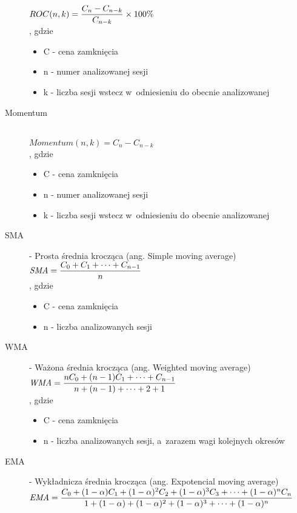 \begin{description}
		$\displaystyle ROC(n, k) = { C_n - C_{n-k} \over C_{n-k} } \times 100\%$ \\
		, gdzie \hfill
			\begin{itemize}
				\item C - cena zamknięcia
				\item n - numer analizowanej sesji
				\item k - liczba sesji wstecz w~odniesieniu do obecnie analizowanej
			\end{itemize}
	\item[Momentum] \hfill \\
		$\displaystyle Momentum(n, k) = C_n - C_{n-k}$ \\
		, gdzie \hfill
			\begin{itemize}
				\item C - cena zamknięcia
				\item n - numer analizowanej sesji
				\item k - liczba sesji wstecz w~odniesieniu do obecnie analizowanej
			\end{itemize}
	\item[SMA] - Prosta średnia krocząca (ang. Simple moving average) \hfill \\
		$\displaystyle \textit{SMA} = { C_{0} + C_{1} + \cdots + C_{n-1} \over n }$ \\
		, gdzie \hfill
			\begin{itemize}
				\item C - cena zamknięcia
				\item n - liczba analizowanych sesji
			\end{itemize}
	\item[WMA] - Ważona średnia krocząca (ang. Weighted moving average) \hfill \\
		$\displaystyle \textit{WMA} = { n C_{0} + (n-1) C_{1} + \cdots + C_{n-1} \over n + (n-1) + \cdots + 2 + 1}$ \\
		, gdzie \hfill
			\begin{itemize}
				\item C - cena zamknięcia
				\item n - liczba analizowanych sesji, a~zarazem wagi kolejnych okresów
			\end{itemize}
	\item[EMA] - Wykładnicza średnia krocząca (ang. Expotencial moving average) \hfill \\
		$\displaystyle \textit{EMA} = { C_0 + (1-\alpha) C_1 + (1-\alpha)^2 C_2 + (1-\alpha)^3 C_3 + \cdots + (1-\alpha)^n C_n \over 1 + (1-\alpha) + (1-\alpha)^2 + (1-\alpha)^3 + \cdots + (1-\alpha)^n}$ \\

\end{description}
